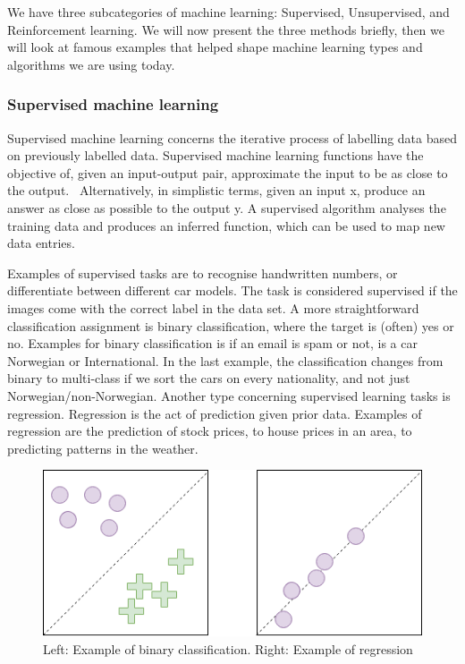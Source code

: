 We have three subcategories of machine learning: Supervised, Unsupervised, and Reinforcement learning. 
We will now present the three methods briefly, then we will look at famous examples that helped shape machine learning types and algorithms we are using today.

\subsubsection{Supervised machine learning}
Supervised machine learning concerns the iterative process of labelling data based on previously labelled data.  Supervised machine learning functions have the objective of, given an input-output pair, approximate the input to be as close to the output.~\cite{AI:ModernApproach} Alternatively, in simplistic terms, given an input x, produce an answer as close as possible to the output y.
A supervised algorithm analyses the training data and produces an inferred function, which can be used to map new data entries. 


Examples of supervised tasks are to recognise handwritten numbers, or differentiate between different car models. The task is considered supervised if the images come with the correct label in the data set. 
A more straightforward classification assignment is binary classification, where the target is (often) yes or no. Examples for binary classification is if an email is spam or not, is a car Norwegian or International. In the last example, the classification changes from binary to multi-class if we sort the cars on every nationality, and not just Norwegian/non-Norwegian. Another type concerning supervised learning tasks is regression. Regression is the act of prediction given prior data. Examples of regression are the prediction of stock prices, to house prices in an area, to predicting patterns in the weather.

\begin{figure}
    \centering
    \includegraphics[scale=0.5]{figures/class_vs_reg.png}
    \caption{Left: Example of binary classification. Right: Example of regression} 
\end{figure}
  



